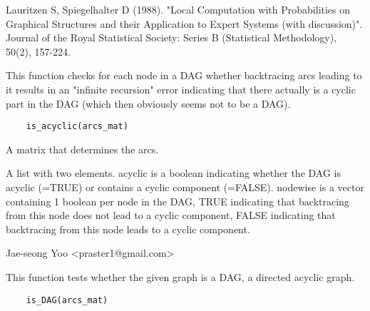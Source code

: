 \documentclass[a4paper]{book}
\begin{document}
%
\begin{References}\relax
Lauritzen S, Spiegelhalter D (1988). "Local Computation with Probabilities on Graphical Structures and their Application to Expert Systems (with discussion)". Journal of the Royal Statistical Society: Series B (Statistical Methodology), 50(2), 157-224.
\end{References}
%
\begin{Description}\relax
This function checks for each node in a DAG whether backtracing arcs leading to it results in an "infinite recursion" error indicating that there actually is a cyclic part in the DAG (which then obviously seems not to be a DAG).
\end{Description}
%
\begin{Usage}
\begin{verbatim}
	is_acyclic(arcs_mat)
\end{verbatim}
\end{Usage}
%
\begin{Arguments}
\begin{ldescription}
\item[\code{arcs\_mat}]  A matrix that determines the arcs. 
\end{ldescription}
\end{Arguments}
%
\begin{Value}
A list with two elements. acyclic is a boolean indicating whether the DAG is acyclic (=TRUE) or contains a cyclic component (=FALSE). nodewise is a vector containing 1 boolean per node in the DAG, TRUE indicating that backtracing from this node does not lead to a cyclic component, FALSE indicating that backtracing from this node leads to a cyclic component.
\end{Value}
%
\begin{Author}\relax
 Jae-seong Yoo <praster1@gmail.com> 
\end{Author}
%
\begin{SeeAlso}\relax
{}
\end{SeeAlso}
%
\begin{Description}\relax
This function tests whether the given graph is a DAG, a directed acyclic graph.
\end{Description}
%
\begin{Usage}
\begin{verbatim}
	is_DAG(arcs_mat)
\end{verbatim}
\end{Usage}
\end{document}
